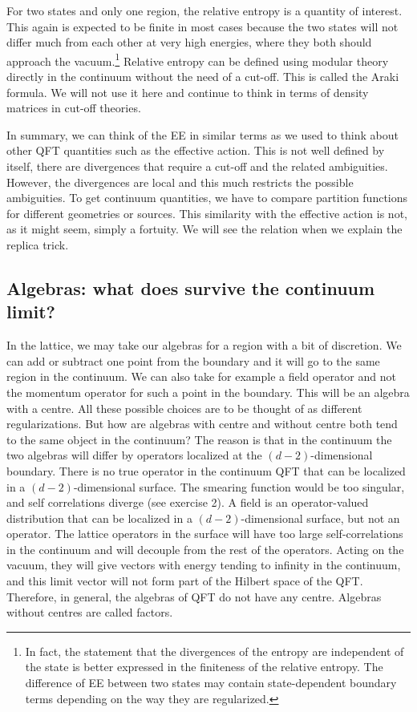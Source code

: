 \documentclass[11pt]{article}
\numberwithin{equation}{section}
\begin{document}
For two states and only one region, the relative entropy is a quantity of interest. This again is expected to be finite in most cases because the two states will not differ much from each other at very high energies, where they both should approach the vacuum.\footnote{In fact, the statement that the divergences of the entropy are independent of the state is better expressed in the finiteness of the relative entropy. The difference of EE between two states may contain state-dependent boundary terms depending on the way they are regularized.} Relative entropy can be defined using modular theory directly in the continuum without the need of a cut-off. This is called the Araki formula. We will not use it here and continue to think in terms of density matrices in cut-off theories. 

In summary, we can think of the EE in similar terms as we used to think about other QFT quantities such as the effective action. This is not well defined by itself, there are divergences that require a cut-off and the related ambiguities. However, the divergences are local and this much restricts the possible ambiguities. To get continuum quantities, we have to compare partition functions for different geometries or sources. This similarity with the effective action is not, as it might seem, simply a fortuity. We will see the relation when we explain the replica trick.  

\subsection{Algebras: what does survive the continuum limit?}
In the lattice, we may take our algebras for a region with a bit of discretion. We can add or subtract one point from the boundary and it will go to the same region in the continuum. We can also take for example a field operator and not the momentum operator for such a point in the boundary. This will be an algebra with a centre. All these possible choices are to be thought of as different regularizations. But how are algebras with centre and without centre both tend to the same object in the continuum? The reason is that in the continuum the two algebras will differ by operators localized at the $(d-2)$-dimensional boundary.  There is no true operator in the continuum QFT that can be localized in a $(d-2)$-dimensional surface. The smearing function would be too singular, and self correlations diverge (see exercise 2). A field is an operator-valued distribution that can be localized in a $(d-2)$-dimensional surface, but not an operator. The lattice operators in the surface will have too large self-correlations in the continuum and will decouple from the rest of the operators. Acting on the vacuum, they will give vectors with energy tending to infinity in the continuum, and this limit vector will not form part of the Hilbert space of the QFT. Therefore, in general, the algebras of QFT do not have any centre. Algebras without centres are called factors. 
\end{document}
